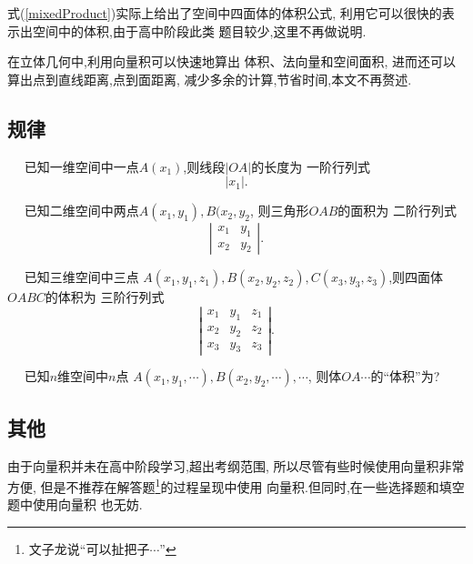 式(\ref{mixedProduct})实际上给出了空间中四面体的体积公式,
利用它可以很快的表示出空间中的体积,由于高中阶段此类
题目较少,这里不再做说明.

在立体几何中,利用向量积可以快速地算出
体积、法向量和空间面积,
进而还可以算出点到直线距离,点到面距离,
减少多余的计算,节省时间,本文不再赘述.


\subsection{规律}

$\quad$ 已知一维空间中一点$A(x_1)$,则线段$|OA|$的长度为
一阶行列式
$$ 
\left|x_1\right|.
$$

$\quad$ 已知二维空间中两点$A(x_1,y_1),B(x_2,y_2$,
则三角形$OAB$的面积为
二阶行列式
$$ 
\left|
\begin{array}{cc}
  x_1&y_1\\
  x_2&y_2
\end{array}
\right|.
$$

$\quad$ 已知三维空间中三点
$A(x_1,y_1,z_1),B(x_2,y_2,z_2),C(x_3,y_3,z_3)$,则四面体$OABC$的体积为
三阶行列式
$$
\left|
\begin{array}{ccc}
  x_1&y_1&z_1\\
  x_2&y_2&z_2\\
  x_3&y_3&z_3
\end{array}
\right|. 
$$

$\quad$ 已知$n$维空间中$n$点
$A(x_1,y_1,\cdots),B(x_2,y_2,\cdots),\cdots$,
则体$OA\cdots$的``体积''为?

\subsection{其他}
由于向量积并未在高中阶段学习,超出考纲范围,
所以尽管有些时候使用向量积非常方便,
但是不推荐在解答题\footnote{文子龙说``可以扯把子$\cdots$''}的过程呈现中使用
向量积.但同时,在一些选择题和填空题中使用向量积
也无妨.

